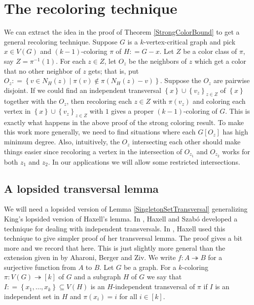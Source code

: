 \documentclass[12pt]{article}
\theoremstyle{plain}
\theoremstyle{definition}
\theoremstyle{remark}
\newcommand{\surj}{\twoheadrightarrow}
\newcommand{\set}[1]{\left\{ #1 \right\}}
\newcommand{\setb}[3]{\left\{ #1 \in #2 \mid #3 \right\}}
\newcommand{\funcsurj}[3]{#1\colon #2 \surj #3}
\newcommand{\irange}[1]{\left[#1\right]}
\newcommand{\DefinedAs}{\mathrel{\mathop:}=}
\begin{document}
\section{The recoloring technique}\label{recolorsection}
We can extract the idea in the proof of Theorem \ref{StrongColorBound} to get a
general recoloring technique.  Suppose $G$ is a $k$-vertex-critical graph and
pick $x \in V(G)$ and $(k-1)$-coloring $\pi$ of $H \DefinedAs G - x$.  Let $Z$
be a color class of $\pi$, say $Z = \pi^{-1}(1)$.  For each $z \in Z$, let
$O_z$ be the neighbors of $z$ which get a color that no other neighbor of $z$ gets; that is, put
$O_z \DefinedAs \setb{v}{N_H(z)}{\pi(v) \not \in \pi(N_H(z) - v)}$.  Suppose the
$O_z$ are pairwise disjoint.  If we could find an independent transversal
$\set{x} \cup \set{v_z}_{z \in Z}$ of $\set{x}$ together with the $O_z$, then
recoloring each $z \in Z$ with $\pi(v_z)$ and coloring each vertex in $\set{x}
\cup \set{v_z}_{z \in Z}$ with $1$ gives a proper $(k-1)$-coloring of $G$.  This
is exactly what happens in the above proof of the strong coloring result.  To
make this work more generally, we need to find situations where each $G[O_z]$
has high minimum degree.  Also, intuitively, the $O_z$ intersecting each other
should make things easier since recoloring a vertex in the intersection of
$O_{z_1}$ and $O_{z_2}$ works for both $z_1$ and $z_2$.  In our applications we
will allow some restricted intersections.

\subsection{A lopsided transversal lemma}
We will need a lopsided version of Lemma \ref{SingletonSetTransversal} generalizing King's \cite{KingHitting} lopsided version of Haxell's lemma. 
In \cite{haxell2006odd}, Haxell and Szab{\'o} developed a technique for
dealing with independent transversals.  In \cite{haxell2011forming}, Haxell used
this technique to give simpler proof of her transversal lemma. The proof gives a bit more and we record that here.  This is just slightly more general than
the extension given in \cite{aharoni2007independent} by Aharoni, Berger and
Ziv. We write $\funcsurj{f}{A}{B}$ for a surjective function from $A$ to $B$.  Let $G$ be a graph.  For a $k$-coloring $\funcsurj{\pi}{V(G)}{\irange{k}}$ of $G$ and a subgraph $H$ of $G$ we say that $I \DefinedAs \set{x_1, \ldots, x_k} \subseteq V(H)$ is an $H$-independent transversal of $\pi$ if $I$ is an independent set in $H$ and $\pi(x_i) = i$ for all $i \in \irange{k}$.
\end{document}

